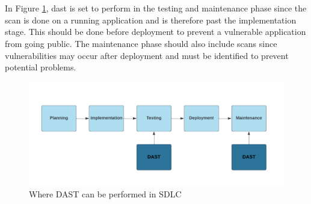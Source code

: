 \\~\\
In Figure \ref{fig: Where to perform DAST in SDLC}, \acrshort{dast} is set to perform in the testing and maintenance phase since the scan is done on a running application and is therefore past the implementation stage. This should be done before deployment to prevent a vulnerable application from going public. The maintenance phase should also include scans since vulnerabilities may occur after deployment and must be identified to prevent potential problems. 
\vspace{2mm}
\begin{figure}[H]
    \centering
    \includegraphics[width=0.8\columnwidth]{Images/dast.png}
    \caption{Where DAST can be performed in SDLC} 
    \label{fig: Where to perform DAST in SDLC}
\end{figure}

